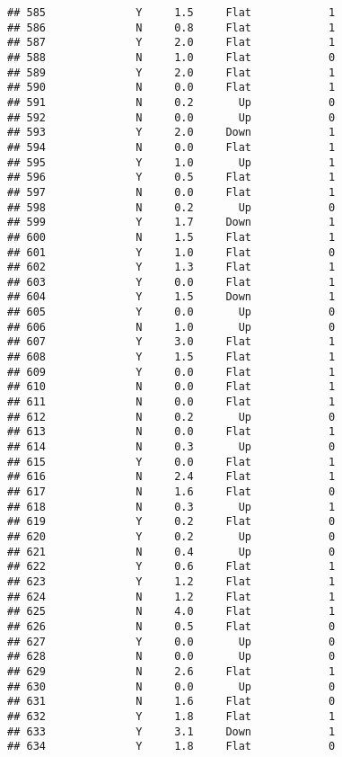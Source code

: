 \documentclass[
]{article}
\begin{document}
\begin{verbatim}
## 585              Y     1.5     Flat            1
## 586              N     0.8     Flat            1
## 587              Y     2.0     Flat            1
## 588              N     1.0     Flat            0
## 589              Y     2.0     Flat            1
## 590              N     0.0     Flat            1
## 591              N     0.2       Up            0
## 592              N     0.0       Up            0
## 593              Y     2.0     Down            1
## 594              N     0.0     Flat            1
## 595              Y     1.0       Up            1
## 596              Y     0.5     Flat            1
## 597              N     0.0     Flat            1
## 598              N     0.2       Up            0
## 599              Y     1.7     Down            1
## 600              N     1.5     Flat            1
## 601              Y     1.0     Flat            0
## 602              Y     1.3     Flat            1
## 603              Y     0.0     Flat            1
## 604              Y     1.5     Down            1
## 605              Y     0.0       Up            0
## 606              N     1.0       Up            0
## 607              Y     3.0     Flat            1
## 608              Y     1.5     Flat            1
## 609              Y     0.0     Flat            1
## 610              N     0.0     Flat            1
## 611              N     0.0     Flat            1
## 612              N     0.2       Up            0
## 613              N     0.0     Flat            1
## 614              N     0.3       Up            0
## 615              Y     0.0     Flat            1
## 616              N     2.4     Flat            1
## 617              N     1.6     Flat            0
## 618              N     0.3       Up            1
## 619              Y     0.2     Flat            0
## 620              Y     0.2       Up            0
## 621              N     0.4       Up            0
## 622              Y     0.6     Flat            1
## 623              Y     1.2     Flat            1
## 624              N     1.2     Flat            1
## 625              N     4.0     Flat            1
## 626              N     0.5     Flat            0
## 627              Y     0.0       Up            0
## 628              N     0.0       Up            0
## 629              N     2.6     Flat            1
## 630              N     0.0       Up            0
## 631              N     1.6     Flat            0
## 632              Y     1.8     Flat            1
## 633              Y     3.1     Down            1
## 634              Y     1.8     Flat            0

\end{verbatim}
\end{document}
